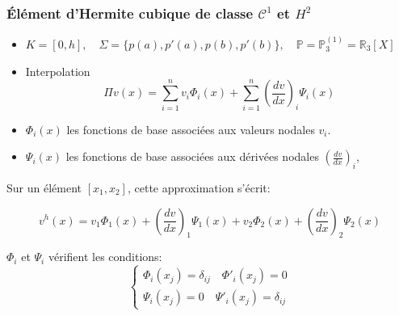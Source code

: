 \documentclass{beamer}
\begin{document}
\begin{frame}
\frametitle{Élément d'Hermite cubique de classe $\mathcal{C}^1$ et $H^2$}

\begin{center}

\end{center}

\begin{itemize}
\item $K=[0,h], \quad \Sigma=\{p(a),p'(a),p(b),p'(b)\},  \quad \mathbb{P}=\mathbb{P}_3^{(1)}=\mathbb{R}_3[X]$
\item Interpolation
\[\Pi v (x)=\sum_{i=1}^{n}v_{i}\Phi_{i}(x)+\sum_{i=1}^{n}(\frac{dv}{dx})_{i}\Psi_{i}(x)\]
\item $\Phi_{i}(x)$ les fonctions de base associées aux valeurs nodales $v_{i}$.
\item $\Psi_{i}(x)$ les fonctions de base associées aux dérivées nodales $(\frac{dv}{dx})_{i}$,
\end{itemize}

Sur un élément $[x_{1},x_{2}]$, cette approximation s'écrit:

\begin{displaymath}
v^{h}(x)=v_{1}\Phi_{1}(x)+(\frac{dv}{dx})_{1}\Psi_{1}(x)+v_{2}\Phi_{2}(x)+(\frac{dv}{dx})_{2}\Psi_{2}(x)\end{displaymath}

$\Phi_{i}$ et $\Psi_i$ vérifient les conditions:
\[\left\{\begin{array}{l}
\Phi_{i}(x_j)=\delta_{ij}\quad \Phi'_{i}(x_j)=0\\
\Psi_{i}(x_j)=0\quad \Psi'_{i}(x_j)=\delta_{ij}
\end{array} \right. \]

\end{frame}
\end{document}
